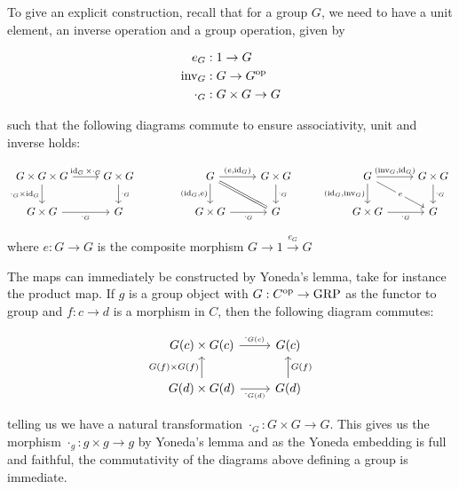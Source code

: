 To give an explicit construction, recall that for a group $G$, we need to have a unit element, an inverse operation and a group operation, given by

\begin{align*}
    e_G&:1\to G\\
    \text{inv}_G&:G\to G^{\operatorname{op}}\\
    \cdot_G&:G\times G\to G
\end{align*}

such that the following diagrams commute to ensure associativity, unit and inverse holds:

\[\begin{tikzcd}
	{G\times G\times G} & {G\times G} && G & {G\times G} && G & {G\times G}\\
	{G\times G} & G && {G\times G} & G && {G\times G} & G
	\arrow["{\cdot_G}"', from=2-1, to=2-2]
	\arrow["{\cdot_G}", from=1-2, to=2-2]
	\arrow["{\cdot_G\times \id_G}"', from=1-1, to=2-1]
	\arrow["{\id_G\times\cdot_G}", from=1-1, to=1-2]
	\arrow[Rightarrow, no head, from=1-4, to=2-5]
	\arrow["{\left(e,\id_G\right)}", from=1-4, to=1-5]
	\arrow["{\cdot_G}", from=1-5, to=2-5]
	\arrow["{\left(\id_G,\text{inv}_G\right)}"', from=1-7, to=2-7]
	\arrow["{\left(\text{inv}_G,\id_G\right)}", from=1-7, to=1-8]
	\arrow["{\cdot_G}", from=1-8, to=2-8]
	\arrow["{\cdot_G}"', from=2-7, to=2-8]
	\arrow["{\left(\id_G,e\right)}"', from=1-4, to=2-4]
	\arrow["{\cdot_G}"', from=2-4, to=2-5]
	\arrow["e"{description}, from=1-7, to=2-8]
\end{tikzcd}\]

where $e:G\to G$ is the composite morphism $G\to 1\overset{e_G}\to G$

The maps can immediately be constructed by Yoneda's lemma, take for instance the product map. If $g$ is a group object with $G:C^{\operatorname{op}}\to\operatorname{GRP}$ as the functor to group and $f:c\to d$ is a morphism in $C$, then the following diagram commutes:

\[\begin{tikzcd}
	{G(c)\times G(c)} & {G(c)} \\
	{G(d)\times G(d)} & {G(d)}
	\arrow["{\cdot_{G(d)}}"', from=2-1, to=2-2]
	\arrow["{\cdot_{G(c)}}", from=1-1, to=1-2]
	\arrow["{G(f)}"', from=2-2, to=1-2]
	\arrow["{G(f)\times G(f)}", from=2-1, to=1-1]
\end{tikzcd}\]

telling us we have a natural transformation $\cdot_G:G\times G\to G$. This gives us the morphism $\cdot_g:g\times g\to g$ by Yoneda's lemma and as the Yoneda embedding is full and faithful, the commutativity of the diagrams above defining a group is immediate.

